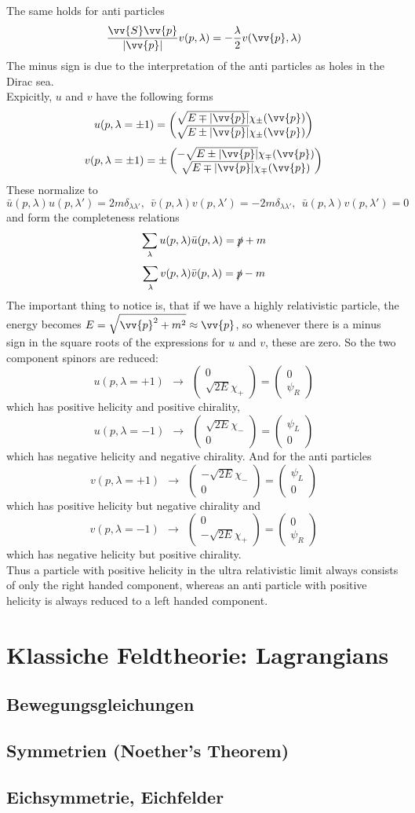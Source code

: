 \documentclass{include/thesisclass}
\newcommand{\vp}{\vv{p}}
\newcommand{\df}{\rightarrow}
\newcommand{\vektorz}[2]{\begin{pmatrix} #1 \\ #2 \end{pmatrix}}
\begin{document}
The same holds for anti particles
\[ \frac{ \vv{S}\vp }{ |\vp| } v(p,\lambda) = - \frac{\lambda}{2}v(\vp, \lambda)\]
The minus sign is due to the interpretation of the anti particles as holes in the Dirac sea.\\
Expicitly, $u$ and $v$ have the following forms
\[ u(p, \lambda = \pm 1) = \vektorz{ \sqrt{ E\mp |\vp|} \chi_\pm(\vp)}{\sqrt{E\pm|\vp|} \chi_\pm(\vp)}\]
\[ v(p, \lambda = \pm 1) = \pm\vektorz{-\sqrt{E\pm|\vp|} \chi_\mp(\vp)}{\sqrt{E\mp |\vp|}\chi_\mp(\vp)}\]
These normalize to
\[ \bar{u}(p, \lambda) u(p, \lambda') = 2m \delta_{\lambda\lambda'}, ~~\bar{v}(p, \lambda)v(p, \lambda') = - 2m \delta_{\lambda\lambda'}, ~~ \bar{u}(p, \lambda)v(p,\lambda') = 0\]
and form the completeness relations
\[ \sum_\lambda u(p,\lambda) \bar{u}(p,\lambda) = \slashed{p} + m\]
\[ \sum_\lambda v(p, \lambda) \bar{v}(p,\lambda) = \slashed{p} - m\]
The important thing to notice is, that if we have a highly relativistic particle, the energy becomes $E = \sqrt{\vp^2 + m^2} \approx \vp$, so whenever there is a minus sign in the square roots of the expressions for $u$ and $v$, these are zero. So the two component spinors are reduced:
\[ u(p, \lambda = +1) ~~\df~~ \vektorz{0}{\sqrt{2E} \chi_+} = \vektorz{0}{\psi_R}\]
which has positive helicity and positive chirality,
\[ u(p, \lambda = -1) ~~\df~~ \vektorz{\sqrt{2E} \chi_-}{0} = \vektorz{\psi_L}{0}\]
which has negative helicity and negative chirality. And for the anti particles
\[v(p, \lambda = +1) ~~\df~~\vektorz{-\sqrt{2E}\chi_-}{0} = \vektorz{\psi_L}{0}\]
which has positive helicity but negative chirality and
\[v(p, \lambda = -1) ~~\df~~\vektorz{0}{- \sqrt{2E} \chi_+} = \vektorz{0}{\psi_R}\]
which has negative helicity but positive chirality.\\
Thus a particle with positive helicity in the ultra relativistic limit always consists of only the right handed component, whereas an anti particle with positive helicity is always reduced to a left handed component.
\chapter{Klassiche Feldtheorie: Lagrangians}
\section{Bewegungsgleichungen}
\section{Symmetrien (Noether's Theorem)}
\section{Eichsymmetrie, Eichfelder}
\end{document}
